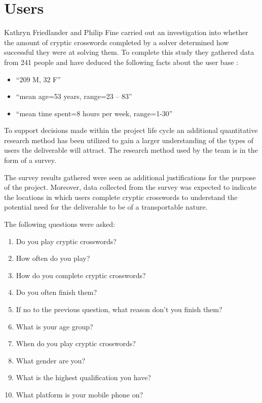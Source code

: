 \section{Users} 

Kathryn Friedlander and Philip Fine \citep{friedlander09} carried out an
investigation into whether the amount of cryptic crosswords completed by a
solver determined how successful they were at solving them. To complete this
study they gathered data from 241 people and have deduced the following facts 
about the user base \citep{friedlander09}:

\begin{itemize}
  \item ``209 M, 32 F''
  \item ``mean age=53 years, range=23 -- 83''
  \item ``mean time spent=8 hours per week, range=1-30''
\end{itemize}

To support decisions made within the project life cycle an additional
quantitative research method has been utilized to gain a larger understanding
of the types of users the deliverable will attract. The research method used by 
the team is in the form of a survey. 

The survey results gathered were seen as additional justifications for the 
purpose of the project. Moreover, data collected from the survey was expected to
indicate the locations in which users complete cryptic crosswords to understand 
the potential need for the deliverable to be of a transportable nature.

The following questions were asked:

\begin{enumerate}
  \item Do you play cryptic crosswords?
  \item How often do you play?
  \item How do you complete cryptic crosswords? %
  \item Do you often finish them?
  \item If no to the previous question, what reason don't you finish them?
  \item What is your age group?
  \item When do you play cryptic crosswords?
  \item What gender are you?
  \item What is the highest qualification you have?
  \item What platform is your mobile phone on?
\end{enumerate}

